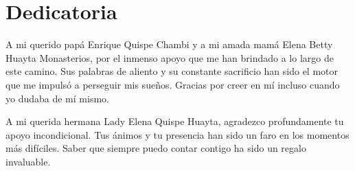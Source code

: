 \chapter*{Dedicatoria}

A mi querido papá Enrique Quispe Chambi y a mi amada mamá Elena Betty Huayta Monasterios, por el inmenso apoyo que me han brindado a lo largo de este camino. Sus palabras de aliento y su constante sacrificio han sido el motor que me impulsó a perseguir mis sueños. Gracias por creer en mí incluso cuando yo dudaba de mí mismo.

A mi querida hermana Lady Elena Quispe Huayta, agradezco profundamente tu apoyo incondicional. Tus ánimos y tu presencia han sido un faro en los momentos más difíciles. Saber que siempre puedo contar contigo ha sido un regalo invaluable.
